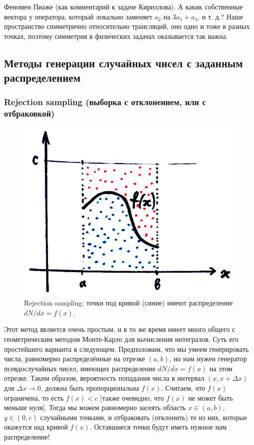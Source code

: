 \documentclass{book}
\begin{document}
Феномен Пиаже (как комментарий к задаче Кириллова). А какик собственные вектора у оператора,
который локально заменяет $a_2$ на $3 a_1 + a_4$, и т. д.? Наше пространство симметрично
относительно трансляций, оно одно и тоже в разных точках, поэтому симметрия в физических задачах
оказывается так важна.

\subsection{Методы генерации случайных чисел с заданным распределением}

\subsubsection{Rejection sampling (выборка с отклонением, или с отбраковкой)}

\begin{figure}
	\includegraphics[width=0.6\linewidth]{rejection-sampling.png}
    \caption{\label{dots-for-monte-carlo}Rejection sampling: точки под кривой (синие) имеют
    распределение $dN/dx = f(x)$.}
\end{figure}

Этот метод является очень простым, и в то же время имеет много общего с геометрическим методом
Монте-Карло для вычисления интегралов. Суть его простейшего варианта в следующем. Предположим, что
мы умеем генерировать числа, равномерно распределённые на отрезке $(a, b)$, но нам нужен генератор
псевдослучайных чисел, имеющих распределение $dN/dx = f(x)$ на этом отрезке. Таким образом,
вероятность попадания числа в интервал $(x, x + \Delta x)$ для $\Delta x \to 0$, должна быть
пропорциональна $f(x)$.  Считаем, что $f(x)$ ограничена, то есть $f(x) < c$ [также очевидно, что
$f(x)$ не может быть меньше нуля]. Тогда мы можем равномерно засеять область $x \in (a, b)$, $y \in
(0, c)$ случайными точками, и отбраковать (отклонить) те из них, которые окажутся над кривой $f(x)$.
Оставшиеся точки будут иметь нужное нам распределение!
\end{document}

